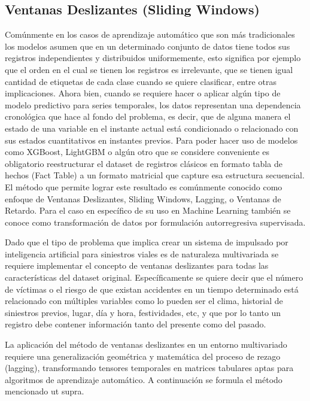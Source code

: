 \subsection{Ventanas Deslizantes (Sliding Windows)}\label{ventanas-deslizantes-sliding-windows}

Comúnmente en los casos de aprendizaje automático que son más tradicionales los modelos asumen que en un determinado conjunto de datos tiene todos sus registros independientes y distribuidos uniformemente, esto significa por ejemplo que el orden en el cual se tienen los registros es irrelevante, que se tienen igual cantidad de etiquetas de cada clase cuando se quiere clasificar, entre otras implicaciones. Ahora bien, cuando se requiere hacer  o aplicar algún tipo de modelo predictivo para series temporales, los datos representan una dependencia cronológica que hace al fondo del problema, es decir, que de alguna manera el estado de una variable en el instante actual está condicionado o relacionado con sus estados cuantitativos en instantes previos. Para poder hacer uso de modelos como XGBoost, LightGBM o algún otro que se considere conveniente es obligatorio reestructurar el dataset de registros clásicos en formato tabla de hechos (Fact Table) a un formato matricial que capture esa estructura secuencial. El método que permite lograr este resultado es comúnmente conocido como enfoque de Ventanas Deslizantes, Sliding Windows, Lagging, o Ventanas de Retardo. Para el caso en específico de su uso en Machine Learning también se conoce como transformación de datos por formulación autorregresiva supervisada.

Dado que el tipo de problema que implica crear un sistema de  impulsado por inteligencia artificial para siniestros viales es de naturaleza multivariada se requiere implementar el concepto de ventanas deslizantes para todas las características del dataset original. Específicamente se quiere decir que el número de víctimas o el riesgo de que existan accidentes en un tiempo determinado está relacionado con múltiples variables como lo pueden ser el clima, historial de siniestros previos, lugar, día y hora, festividades, etc, y que por lo tanto un registro debe contener información tanto del presente como del pasado.

La aplicación del método de ventanas deslizantes en un entorno multivariado requiere una generalización geométrica y matemática del proceso de rezago (lagging), transformando tensores temporales en matrices tabulares aptas para algoritmos de aprendizaje automático. A continuación se formula el método mencionado ut supra.

